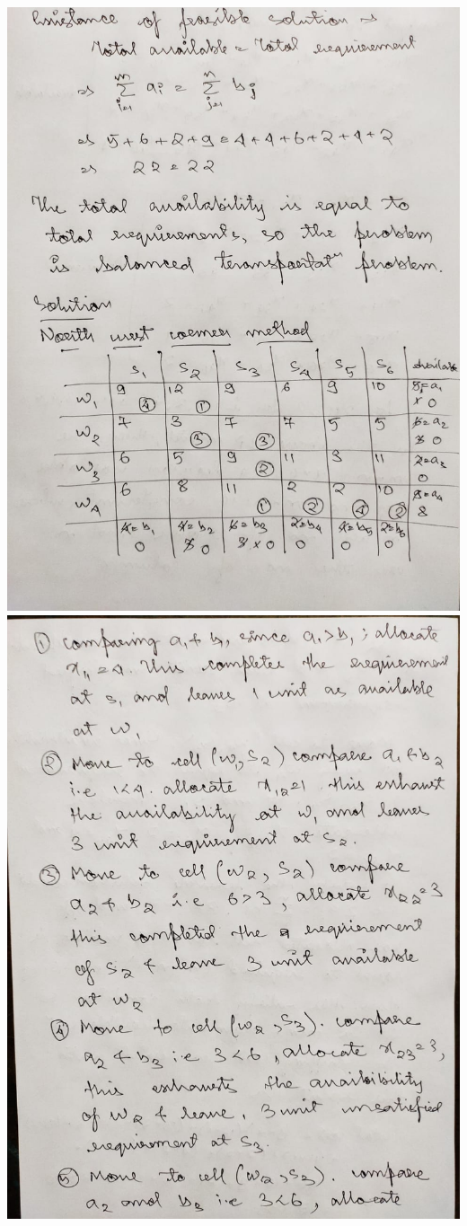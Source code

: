 \documentclass[12pt, letterpaper, twoside]{book}
\begin{document}
\includegraphics[width=\paperwidth, height=\paperheight]{Page10}
\includegraphics[width=\paperwidth, height=\paperheight]{Page11}
\end{document}
